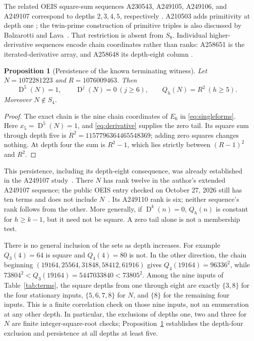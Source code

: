 \documentclass[11pt]{article}
\newcommand{\D}{\operatorname{D}}
\newtheorem{proposition}[theorem]{Proposition}
\theoremstyle{definition}
\theoremstyle{remark}
\begin{document}
The related OEIS square-sum sequences A230543, A249105, A249106,
and A249107 correspond to depths $2,3,4,5$, respectively
\cite{depthentries}. A210503 adds primitivity at depth one
\cite{triples}; the twin-prime construction of primitive triples is
also discussed by Balzarotti and Lava~\cite[Chapter 22]{book}.
That restriction is absent from $S_8$. Individual higher-derivative
sequences encode chain coordinates rather than ranks: A258651 is
the iterated-derivative array, and A258648 its depth-eight column
\cite{arrayentries}.

\begin{proposition}[Persistence of the known terminating witness]
\label{prop:tail}
Let $N=1072281223$ and $R=1076009463$. Then
\[
 \D^5(N)=1,\qquad\D^j(N)=0\ (j\ge6),\qquad
 Q_h(N)=R^2\ (h\ge5).
\]
Moreover $N\notin S_4$.
\end{proposition}
\begin{proof}
The exact chain is the nine chain coordinates of $E_6$ in
\eqref{eq:singleforms}. Here $x_5=\D^5(N)=1$, and
\eqref{eq:derivative} supplies the zero tail. Its square sum through
depth five is $R^2=1157796364465548369$; adding zero squares changes
nothing. At depth four the sum is $R^2-1$, which lies strictly
between $(R-1)^2$ and $R^2$.
\end{proof}
This persistence, including its depth-eight consequence, was already
established in the A249107 study~\cite{corti7}. There $N$ has rank
twelve in the author's extended A249107 sequence; the public OEIS
entry checked on October 27, 2026 still has ten terms and does not
include $N$~\cite{depthentries}. Its A249110 rank is six; neither
sequence's rank follows from the other. More generally, if $\D^k(n)=0$, $Q_h(n)$ is constant
for $h\ge k-1$, but it need not be square. A zero tail alone is not
a membership test.

There is no general inclusion of the sets as depth increases. For
example $Q_3(4)=64$ is square and $Q_4(4)=80$ is not. In the other
direction, the chain beginning
$(19164,25564,31848,58412,61916)$ gives
$Q_4(19164)=96336^2$, while
$73804^2<Q_3(19164)=5447033840<73805^2$.
Among the nine inputs of Table~\ref{tab:terms}, the square depths
from one through eight are exactly $\{3,8\}$ for the four
stationary inputs, $\{5,6,7,8\}$ for $N$, and $\{8\}$ for the
remaining four inputs. This is a finite correlation check on those
nine inputs, not an enumeration at any other depth. In particular,
the exclusions of depths one, two and three for $N$ are finite
integer-square-root checks; Proposition~\ref{prop:tail} establishes
the depth-four exclusion and persistence at all depths at least five.
\end{document}
